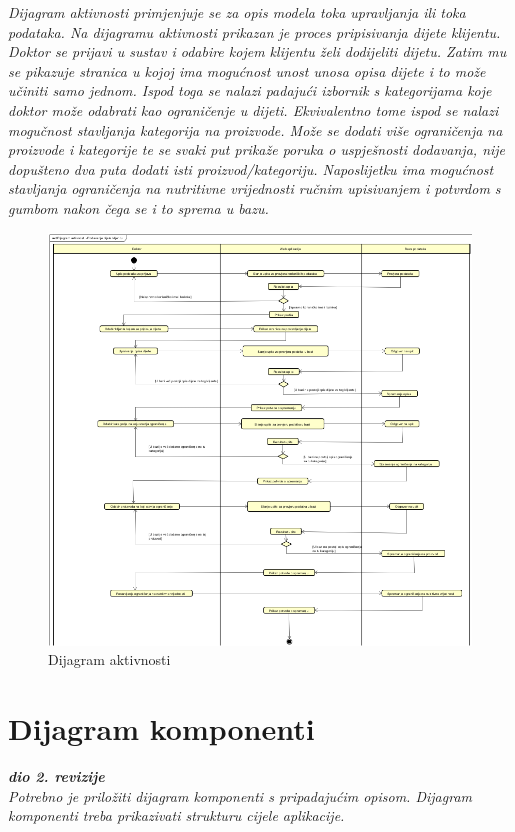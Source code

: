 		
		\textit{Dijagram aktivnosti primjenjuje se za opis modela toka upravljanja ili toka podataka. Na dijagramu aktivnosti prikazan je proces pripisivanja dijete klijentu. Doktor se prijavi u sustav i odabire kojem klijentu želi dodijeliti dijetu. Zatim mu se pikazuje stranica u kojoj ima mogućnost unost unosa opisa dijete i to može učiniti samo jednom. Ispod toga se nalazi padajući izbornik s kategorijama koje doktor može odabrati kao ograničenje u dijeti. Ekvivalentno tome ispod se nalazi mogučnost stavljanja kategorija na proizvode. Može se dodati više ograničenja na proizvode i kategorije te se svaki put prikaže poruka o uspješnosti dodavanja, nije dopušteno dva puta dodati isti proizvod/kategoriju. Naposlijetku ima mogućnost stavljanja ograničenja na nutritivne vrijednosti ručnim upisivanjem i potvrdom s gumbom nakon čega se i to sprema u bazu.  }
		
		\begin{figure}
			\centering
			\includegraphics[scale=0.8]{dijagrami/Dijagram_Aktivnosti}
			\caption{Dijagram aktivnosti}
		\end{figure}
		
		\eject
		\newpage
		\section{Dijagram komponenti}
		
			\textbf{\textit{dio 2. revizije}}\\
		
			 \textit{Potrebno je priložiti dijagram komponenti s pripadajućim opisom. Dijagram komponenti treba prikazivati strukturu cijele aplikacije.}